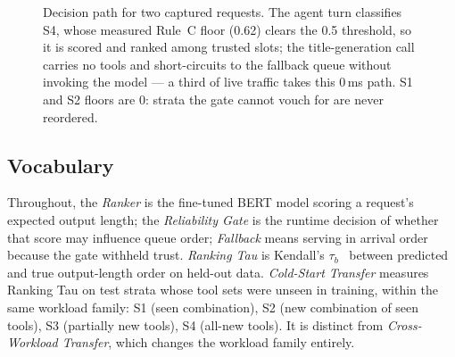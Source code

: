 \begin{figure}[t]
  \caption{Decision path for two captured requests. The agent turn classifies
  S4, whose measured Rule~C floor (0.62) clears the 0.5 threshold, so it is
  scored and ranked among trusted slots; the title-generation call carries no
  tools and short-circuits to the fallback queue without invoking the model
  --- a third of live traffic takes this 0\,ms path. S1 and S2 floors are 0:
  strata the gate cannot vouch for are never reordered.}
  \label{fig:components}
\end{figure}

\subsection{Vocabulary}
Throughout, the \emph{Ranker} is the fine-tuned BERT model scoring a
request's expected output length; the \emph{Reliability Gate} is the runtime
decision of whether that score may influence queue order; \emph{Fallback}
means serving in arrival order because the gate withheld trust.
\emph{Ranking Tau} is Kendall's $\tau_b$~\cite{kendall1938} between predicted and true
output-length order on held-out data. \emph{Cold-Start Transfer} measures
Ranking Tau on test strata whose tool sets were unseen in training, within
the same workload family: S1 (seen combination), S2 (new combination of seen
tools), S3 (partially new tools), S4 (all-new tools). It is distinct from
\emph{Cross-Workload Transfer}, which changes the workload family entirely.
